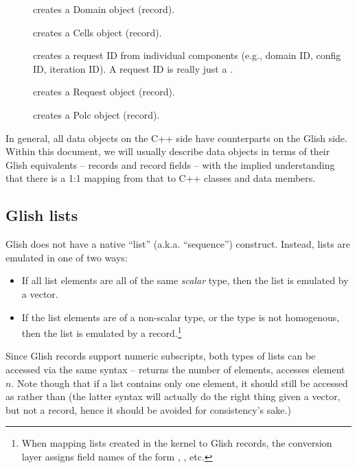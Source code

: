 \documentclass[10pt,twoside]{book}
\begin{document}
  \begin{description}
  
  \item[] creates a Domain object (record).

  \item[] creates a Cells object (record).

  \item[] creates a request ID from individual components
  (e.g., domain ID, config ID, iteration ID). A request ID is really just a
  .

  \item[] creates a Request object (record).
  
  \item[] creates a Polc object (record).
  
  \end{description}
  
  In general, all data objects on the C++ side have counterparts on the Glish
  side. Within this document, we will usually describe data objects in terms of
  their Glish equivalents -- records and record fields -- with the implied
  understanding that there is a 1:1 mapping from that to C++ classes and data
  members.

\subsection{Glish lists}

  Glish does not have a native ``list'' (a.k.a. ``sequence'') construct.
  Instead, lists are emulated in one of two ways:

  \begin{itemize}

  \item If all list elements are all of the same {\em scalar} type,
  then the list is emulated by a vector.
  
  \item If the list elements are of a non-scalar type, or the type is not
  homogenous, then the list is emulated by a record.\footnote{When mapping lists created
  in the kernel to Glish records, the conversion layer assigns field names of
  the form , , etc.}
  \end{itemize}

  Since Glish records support numeric subscripts, both types of lists can be
  accessed via the same syntax --  returns the number of
  elements,  accesses element $n$. Note though that if a list
  contains only one element, it should still be accessed as  rather
  than  (the latter syntax will actually do the right thing given a
  vector, but not a record, hence it should be avoided for consistency's sake.)
\end{document}
